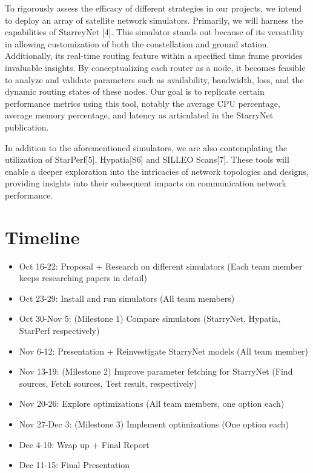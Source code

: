 \documentclass[conference]{IEEEtran}
\begin{document}
To rigorously assess the efficacy of different strategies in our projects, we intend to deploy an array of satellite network simulators. Primarily, we will harness the capabilities of StarreyNet [4]. This simulator stands out because of its versatility in allowing customization of both the constellation and ground station. Additionally, its real-time routing feature within a specified time frame provides invaluable insights. By conceptualizing each router as a node, it becomes feasible to analyze and validate parameters such as availability, bandwidth, loss, and the dynamic routing states of these nodes. Our goal is to replicate certain performance metrics using this tool, notably the average CPU percentage, average memory percentage, and latency as articulated in the StarryNet publication.

In addition to the aforementioned simulators, we are also contemplating the utilization of StarPerf[5], Hypatia[S6] and SILLEO Scans[7]. These tools will enable a deeper exploration into the intricacies of network topologies and designs, providing insights into their subsequent impacts on communication network performance.



\section{Timeline}


\begin{itemize}
\item Oct 16-22: Proposal + Research on different simulators (Each team member keeps researching papers in detail)
\item Oct 23-29: Install and run simulators (All team members)
\item Oct 30-Nov 5: (Milestone 1) Compare simulators  (StarryNet, Hypatia, StarPerf respectively)
 \item Nov 6-12: Presentation + Reinvestigate StarryNet models (All team member)
\item Nov 13-19: (Milestone 2) Improve parameter fetching for StarryNet  (Find sources, Fetch sources, Test result, respectively)
\item Nov 20-26: Explore optimizations (All team members, one option each)
\item Nov 27-Dec 3: (Milestone 3) Implement optimizations  (One option each)
\item Dec 4-10: Wrap up + Final Report
\item Dec 11-15: Final Presentation

\end{itemize}
\end{document}
